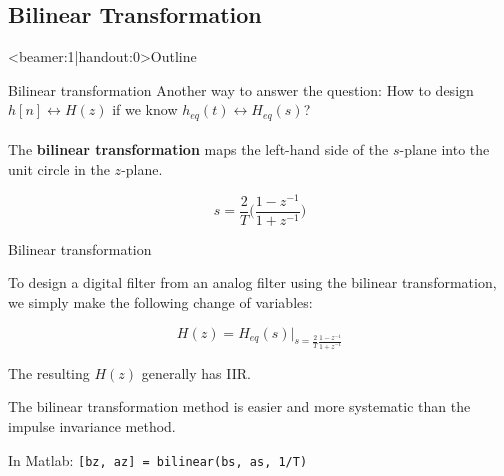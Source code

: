 \documentclass[10pt]{beamer}
\begin{document}
%
\subsection{Bilinear Transformation}
\begin{frame}<beamer:1|handout:0>{Outline} 
\tableofcontents[currentsubsection]
\end{frame}

%
\begin{frame}{Bilinear transformation}
Another way to answer the question: How to design $h[n] \longleftrightarrow H(z)$ if we know $h_{eq}(t) \longleftrightarrow H_{eq}(s)$?
~\\
~\\

The \textbf{bilinear transformation} maps the left-hand side of the $s$-plane into the unit circle in the $z$-plane.
	
\begin{equation*}
	s = \frac{2}{T}\bigg(\frac{1 - z^{-1}}{1 + z^{-1}}\bigg) \tag{Bilinear transformation}
\end{equation*}

\begin{center}
	\resizebox{0.9\linewidth}{!}{}
\end{center}	
\end{frame}

\begin{frame}{Bilinear transformation}

To design a digital filter from an analog filter using the bilinear transformation, we simply make the following change of variables:

\begin{equation*}
H(z) = H_{eq}(s)\bigg|_{\displaystyle s = \frac{2}{T}\frac{1 - z^{-1}}{1 + z^{-1}}}
\end{equation*}

The resulting $H(z)$ generally has IIR.
\vspace{0.25cm}

The bilinear transformation method is easier and more systematic than the impulse invariance method.
\vspace{0.25cm}

In Matlab: \texttt{[bz, az] = bilinear(bs, as, 1/T)}

\end{frame}
\end{document}
